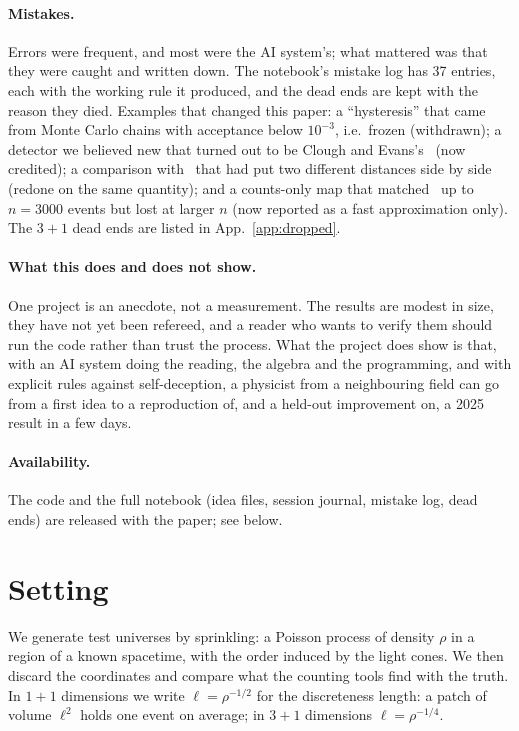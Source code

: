 \documentclass[11pt,a4paper]{article}
\begin{document}
\paragraph{Mistakes.} Errors were frequent, and most were the AI system's; what mattered was that they were caught and written down. The notebook's mistake log has 37 entries, each with the working rule it produced, and the dead ends are kept with the reason they died. Examples that changed this paper: a ``hysteresis'' that came from Monte Carlo chains with acceptance below $10^{-3}$, i.e.\ frozen (withdrawn); a detector we believed new that turned out to be Clough and Evans's~\cite{CloughEvans16} (now credited); a comparison with~\cite{Johnston25} that had put two different distances side by side (redone on the same quantity); and a counts-only map that matched~\cite{Johnston25} up to $n=3000$ events but lost at larger $n$ (now reported as a fast approximation only). The $3+1$ dead ends are listed in App.~\ref{app:dropped}.

\paragraph{What this does and does not show.} One project is an anecdote, not a measurement. The results are modest in size, they have not yet been refereed, and a reader who wants to verify them should run the code rather than trust the process. What the project does show is that, with an AI system doing the reading, the algebra and the programming, and with explicit rules against self-deception, a physicist from a neighbouring field can go from a first idea to a reproduction of, and a held-out improvement on, a 2025 result in a few days.

\paragraph{Availability.} The code and the full notebook (idea files, session journal, mistake log, dead ends) are released with the paper; see below.

\section{Setting}\label{sec:setting}
We generate test universes by sprinkling: a Poisson process of density $\rho$ in a region of a known spacetime, with the order induced by the light cones. We then discard the coordinates and compare what the counting tools find with the truth. In $1+1$ dimensions we write $\ell=\rho^{-1/2}$ for the discreteness length: a patch of volume $\ell^2$ holds one event on average; in $3+1$ dimensions $\ell=\rho^{-1/4}$.
\end{document}
